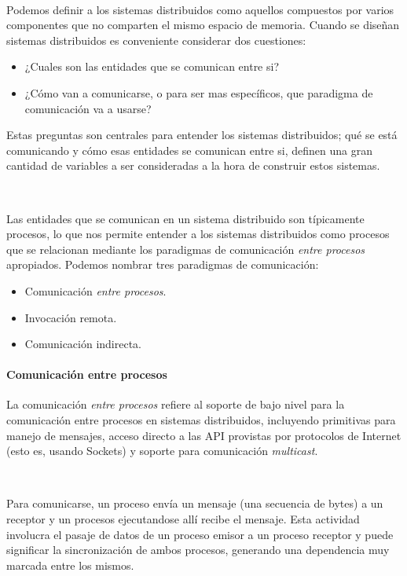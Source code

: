 \documentclass[a4paper,12pt, oneside]{article}
\begin{document}
\

Podemos definir a los sistemas distribuidos como aquellos compuestos por varios componentes que no comparten el mismo espacio de memoria\cite{Muhl:2006:DES:1162246}. Cuando se diseñan sistemas distribuidos es conveniente considerar dos cuestiones: 

\begin{itemize}
	\item ¿Cuales son las entidades que se comunican entre si?
	\item ¿Cómo van a comunicarse, o para ser mas específicos, que paradigma de comunicación va a usarse?
\end{itemize}

Estas preguntas son centrales para entender los sistemas distribuidos; qué se está comunicando y cómo esas entidades se comunican entre si, definen una gran cantidad de variables a ser consideradas a la hora de construir estos sistemas.

\

Las entidades que se comunican en un sistema distribuido son típicamente procesos, lo que nos permite entender a los sistemas distribuidos como procesos que se relacionan mediante los paradigmas de comunicación \textit{entre procesos} apropiados. Podemos nombrar tres paradigmas de comunicación:

\begin{itemize}
	\item Comunicación \textit{entre procesos}.
	\item Invocación remota.
	\item Comunicación indirecta.
\end{itemize}

\paragraph{Comunicación entre procesos}
La comunicación \textit{entre procesos} refiere al soporte de bajo nivel para la comunicación entre procesos en sistemas distribuidos, incluyendo primitivas para manejo de mensajes, acceso directo a las API provistas por protocolos de Internet (esto es, usando Sockets) y soporte para comunicación \textit{multicast}.

\

Para comunicarse, un proceso envía un mensaje (una secuencia de bytes) a un receptor y un procesos ejecutandose allí recibe el mensaje. Esta actividad involucra el pasaje de datos de un proceso emisor a un proceso receptor y puede significar la sincronización de ambos procesos, generando una dependencia muy marcada entre los mismos.
\end{document}
